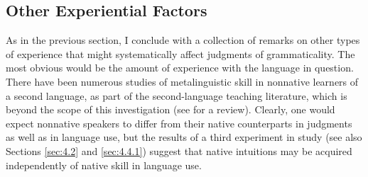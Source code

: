 \subsection{ Other Experiential Factors} \label{sec:4.4.3}

As in the previous section, I conclude with a collection of remarks on other types of experience that might systematically affect judgments of grammaticality. The most obvious would be the amount of experience with the language in question. There have been numerous studies of metalinguistic skill in nonnative learners of a second language, as part of the second-language teaching literature, which is beyond the scope of this investigation (see \citet{Ellis1991} for a review). Clearly, one would expect nonnative speakers to differ from their native counterparts in judgments as well as in language use, but the results of a third experiment
in  study (see also Sections \ref{sec:4.2} and \ref{sec:4.4.1})
suggest that native intuitions may be acquired independently of native skill in language use.

